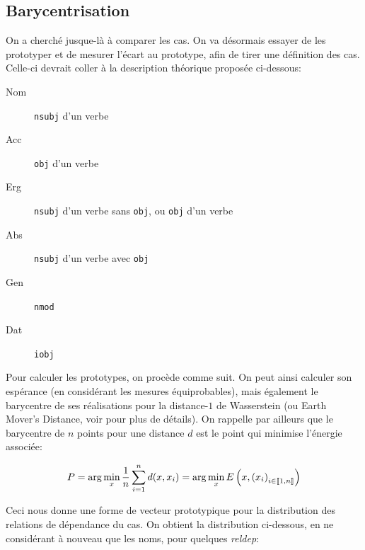 \documentclass{cours}
\begin{document}
\subsection{Barycentrisation}\label{subsec:bary}
On a cherché jusque-là à comparer les cas.
On va désormais essayer de les prototyper et de mesurer l'écart au prototype, afin de tirer une définition des cas.
Celle-ci devrait coller à la description théorique proposée ci-dessous:
\begin{multicols}{2}
	\begin{description}
		\item[Nom] \texttt{nsubj} d'un verbe
		\item[Acc] \texttt{obj} d'un verbe
		\item[Erg] \texttt{nsubj} d'un verbe sans \texttt{obj}, ou \texttt{obj} d'un verbe
		\item[Abs] \texttt{nsubj} d'un verbe avec \texttt{obj}
		\item[Gen] \texttt{nmod}
		\item[Dat] \texttt{iobj}
	\end{description}
\end{multicols}
Pour calculer les prototypes, on procède comme suit.
On peut ainsi calculer son espérance (en considérant les mesures équiprobables), mais également le barycentre de ses réalisations pour la distance-$1$ de Wasserstein (ou Earth Mover's Distance, voir \cite{PythonPOT} pour plus de détails).
On rappelle par ailleurs que le barycentre de $n$ points pour une distance $d$ est le point qui minimise l'énergie associée:

\begin{equation*}
	P = \arg\min_{x} \frac{1}{n}\sum_{i = 1}^{n} d(x, x_{i}) = \arg\min_{x} E\left(x, \left(x_{i}\right)_{i \in \left\llbracket 1, n\right\rrbracket}\right)
\end{equation*}

Ceci nous donne une forme de vecteur prototypique pour la distribution des relations de dépendance du cas.
On obtient la distribution ci-dessous, en ne considérant à nouveau que les noms, pour quelques \textit{reldep}:
\end{document}
